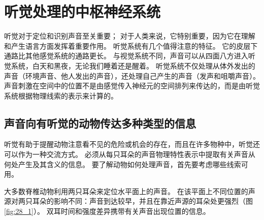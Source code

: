 \chapter{听觉处理的中枢神经系统} \label{chap:chap28}
听觉对于定位和识别声音至关重要； 对于人类来说，它特别重要，因为它在理解和产生语言方面发挥着重要作用。 听觉系统有几个值得注意的特征。 它的皮层下通路比其他感觉系统的通路更长。 与视觉系统不同，声音可以从四面八方进入听觉系统，白天和黑夜，无论我们睡着还是醒着。 听觉系统不仅处理从体外发出的声音（环境声音、他人发出的声音），还处理自己产生的声音（发声和咀嚼声音）。 声音刺激在空间中的位置不是由感觉传入神经元的空间排列来传达的，而是由听觉系统根据物理线索的表示来计算的。

\section{声音向有听觉的动物传达多种类型的信息}
听觉有助于提醒动物注意看不见的危险或机会的存在，而且在许多物种中，听觉还可以作为一种交流方式。 必须从每只耳朵的声音物理特性表示中提取有关声音从何处产生及其含义的信息。 要了解动物如何处理声音，首先要考虑哪些线索可用。

大多数脊椎动物利用两只耳朵来定位水平面上的声音。 在该平面上不同位置的声源对两只耳朵的影响不同：声音到达较早，并且在靠近声源的耳朵处更强烈（图\ref{fig:28_1}）。 双耳时间和强度差异携带有关声音出现位置的信息。

